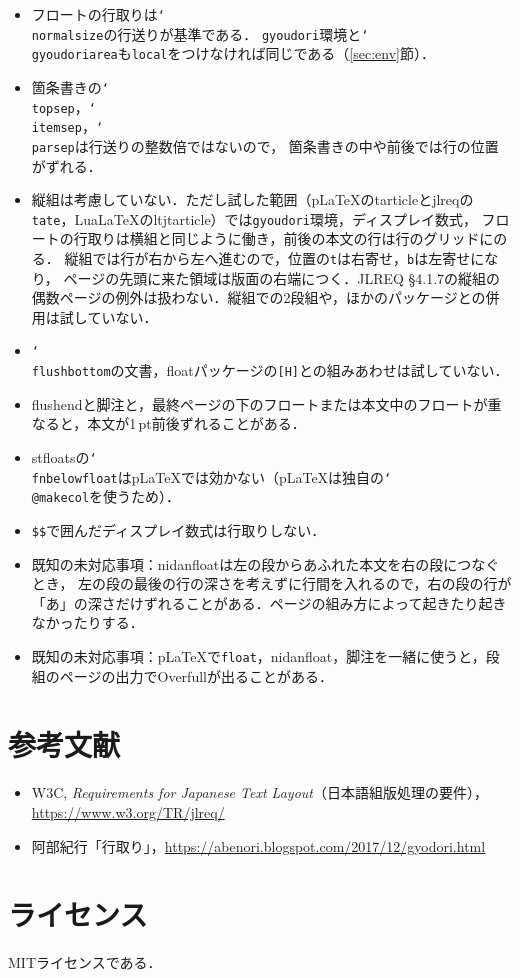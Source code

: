 \documentclass[paper=a4,dvipdfmx]{jlreq}
\newcommand\pkg[1]{\textsf{#1}}
\newcommand\opt[1]{\texttt{#1}}
\newcommand\env[1]{\texttt{#1}}
\newcommand\cs[1]{\texttt{\char`\\#1}}
\begin{document}
\begin{itemize}
\item フロートの行取りは\cs{normalsize}の行送りが基準である．
 \env{gyoudori}環境と\cs{gyoudoriarea}も\opt{local}をつけなければ同じである（\ref{sec:env}\nobreak 節）．
\item 箇条書きの\cs{topsep}，\cs{itemsep}，\cs{parsep}は行送りの整数倍ではないので，
 箇条書きの中や前後では行の位置がずれる．
\item 縦組は考慮していない．ただし試した範囲（pLaTeXの\pkg{tarticle}と\pkg{jlreq}の\opt{tate}，LuaLaTeXの\pkg{ltjtarticle}）では\env{gyoudori}環境，ディスプレイ数式，
 フロートの行取りは横組と同じように働き，前後の本文の行は行のグリッドにのる．
 縦組では行が右から左へ進むので，位置の\opt{t}は右寄せ，\opt{b}は左寄せになり，
 ページの先頭に来た領域は版面の右端につく．JLREQ \S4.1.7の縦組の偶数ページの例外は扱わない．縦組での2段組や，ほかのパッケージとの併用は試していない．
\item \cs{flushbottom}の文書，\pkg{float}パッケージの\opt{[H]}との組みあわせは試していない．
\item \pkg{flushend}と脚注と，最終ページの下のフロートまたは本文中のフロートが重なると，本文が1\,pt前後ずれることがある．
\item \pkg{stfloats}の\cs{fnbelowfloat}はpLaTeXでは効かない（pLaTeXは独自の\cs{@makecol}を使うため）．
\item \verb|$$|で囲んだディスプレイ数式は行取りしない．
\item 既知の未対応事項：\pkg{nidanfloat}は左の段からあふれた本文を右の段につなぐとき，
 左の段の最後の行の深さを考えずに行間を入れるので，右の段の行が「あ」の深さだけずれることがある．ページの組み方によって起きたり起きなかったりする．
\item 既知の未対応事項：pLaTeXで\opt{float}，\pkg{nidanfloat}，脚注を一緒に使うと，段組のページの出力でOverfullが出ることがある．
\end{itemize}

\section{参考文献}

\begin{itemize}
\item W3C, \textit{Requirements for Japanese Text Layout}（日本語組版処理の要件），\url{https://www.w3.org/TR/jlreq/}
\item 阿部紀行「行取り」，\url{https://abenori.blogspot.com/2017/12/gyodori.html}
\end{itemize}

\section{ライセンス}

MITライセンスである．
\end{document}
